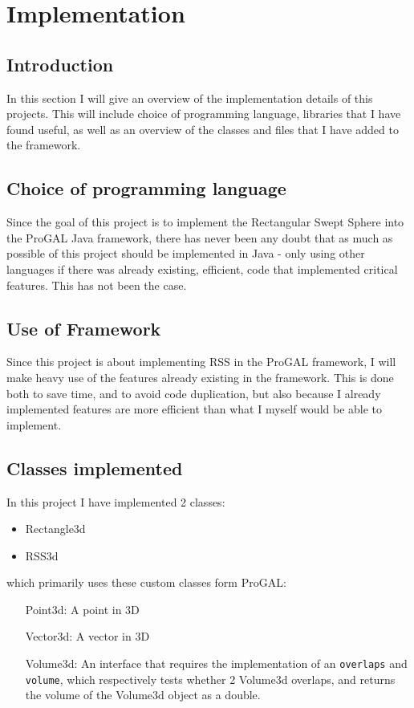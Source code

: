 
\section{Implementation}
\label{implementation}

\subsection{Introduction}
In this section I will give an overview of the implementation details of this projects. This will include choice of programming language, libraries that I have found useful, as well as an overview of the classes and files that I have added to the framework.

\subsection{Choice of programming language}
Since the goal of this project is to implement the Rectangular Swept Sphere into the ProGAL Java framework, there has never been any doubt that as much as possible of this project should be implemented in Java - only using other languages if there was already existing, efficient, code that implemented critical features. This has not been the case.

\subsection{Use of Framework}
Since this project is about implementing RSS in the ProGAL framework, I will make heavy use of the features already existing in the framework. This is done both to save time, and to avoid code duplication, but also because I already implemented features are more efficient than what I myself would be able to implement.

\subsection{Classes implemented}
In this project I have implemented 2 classes:
\begin{itemize}
\item Rectangle3d
\item RSS3d
\end{itemize}

which primarily uses these custom classes form ProGAL:

\begin{itemize}
\item[Point3d:] A point in 3D
\item[Vector3d:] A vector in 3D
\item[Volume3d:] An interface that requires the implementation of an \texttt{overlaps} and \texttt{volume}, which respectively tests whether 2 Volume3d overlaps, and returns the volume of the Volume3d object as a double.
\end{itemize}

